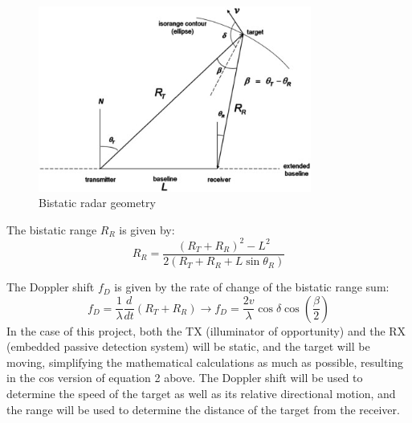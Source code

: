 \documentclass[12pt,a4paper]{article}
\begin{document}
\begin{figure}[htbp]
    \centering
    \includegraphics[width=0.8\textwidth]{geomPR.jpg}
    \caption{Bistatic radar geometry \cite{FundamentalsPassiveRadar}}
    \label{fig:geometry}
\end{figure}

\par \vspace{0.5cm} 
\noindent The bistatic range \( R_R \) is given by:
\begin{equation}
R_R = \frac{(R_T + R_R)^2 - L^2}{2(R_T + R_R + L \sin \theta_R)}
\end{equation}

\noindent The Doppler shift \( f_D \) is given by the rate of change of the bistatic range sum:
\begin{equation}
f_D = \frac{1}{\lambda} \frac{d}{dt}(R_T + R_R) \xrightarrow{} f_D = \frac{2v}{\lambda} \cos \delta \cos(\frac{\beta}{2})
\end{equation}
In the case of this project, both the TX (illuminator of opportunity) and the RX (embedded passive detection system) will be static, and the target will be moving, simplifying the mathematical calculations as much as possible, resulting in the cos version of equation 2 above. The Doppler shift will be used to determine the speed of the target as well as its relative directional motion, and the range will be used to determine the distance of the target from the receiver.
\end{document}
